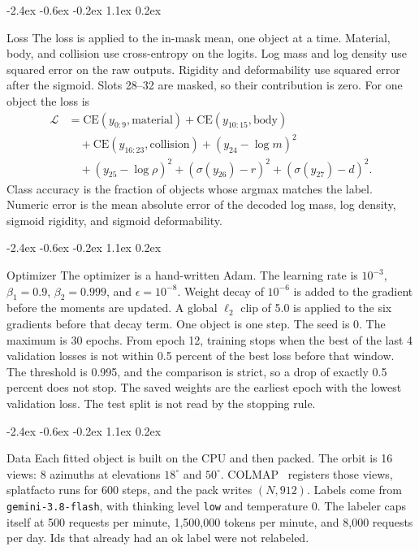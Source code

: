 \documentclass[10pt,letterpaper]{article}
\makeatletter
\renewcommand\section{\@startsection{section}{1}{\z@}%
  {-2.4ex \@plus -0.6ex \@minus -0.2ex}%
  {1.1ex \@plus 0.2ex}%
  {\large\bfseries\raggedright}}
\DeclareRobustCommand{\_}{\textunderscore\allowbreak}
\makeatother
\begin{document}
\section{Loss}
The loss is applied to the in-mask mean, one object at a time.
Material, body, and collision use cross-entropy on the logits.
Log mass and log density use squared error on the raw outputs.
Rigidity and deformability use squared error after the sigmoid.
Slots 28--32 are masked, so their contribution is zero.
For one object the loss is
\begin{align*}
\mathcal{L}
&= \mathrm{CE}(y_{0:9}, \mathrm{material})
+ \mathrm{CE}(y_{10:15}, \mathrm{body}) \\
&\quad + \mathrm{CE}(y_{16:23}, \mathrm{collision})
+ (y_{24} - \log m)^2 \\
&\quad + (y_{25} - \log \rho)^2
+ (\sigma(y_{26}) - r)^2
+ (\sigma(y_{27}) - d)^2.
\end{align*}
Class accuracy is the fraction of objects whose argmax matches the label.
Numeric error is the mean absolute error of the decoded log mass, log density, sigmoid rigidity, and sigmoid deformability.

\section{Optimizer}
The optimizer is a hand-written Adam.
The learning rate is \(10^{-3}\), \(\beta_1 = 0.9\), \(\beta_2 = 0.999\), and \(\epsilon = 10^{-8}\).
Weight decay of \(10^{-6}\) is added to the gradient before the moments are updated.
A global \(\ell_2\) clip of 5.0 is applied to the six gradients before that decay term.
One object is one step.
The seed is 0.
The maximum is 30 epochs.
From epoch 12, training stops when the best of the last 4 validation losses is not within 0.5 percent of the best loss before that window.
The threshold is 0.995, and the comparison is strict, so a drop of exactly 0.5 percent does not stop.
The saved weights are the earliest epoch with the lowest validation loss.
The test split is not read by the stopping rule.

\section{Data}
Each fitted object is built on the CPU and then packed.
The orbit is 16 views: 8 azimuths at elevations \(18^\circ\) and \(50^\circ\).
COLMAP~\cite{schoenberger2016sfm} registers those views, splatfacto runs for 600 steps, and the pack writes \((N, 912)\).
Labels come from \texttt{gemini-3.8-flash}, with thinking level \texttt{low} and temperature 0.
The labeler caps itself at 500 requests per minute, 1{,}500{,}000 tokens per minute, and 8{,}000 requests per day.
Ids that already had an ok label were not relabeled.
\end{document}
